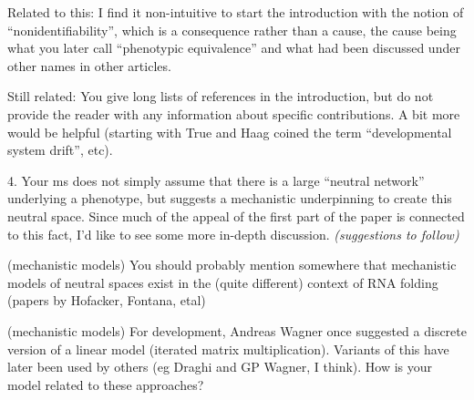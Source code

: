 \begin{point}{}
    Related to this: I find it non-intuitive to start the introduction with the
notion of ``nonidentifiability'', which is a consequence rather than a cause, the
cause being what you later call ``phenotypic equivalence'' and what had been
discussed under other names in other articles.
\end{point}


\begin{point}{}
    Still related: You give long lists of references in the introduction, but do
not provide the reader with any information about specific contributions. A bit
more would be helpful (starting with True and Haag coined the term
``developmental system drift'', etc).
\end{point}


\begin{point}{4.}
    Your ms does not simply assume that there is a large ``neutral network''
underlying a phenotype, but suggests a mechanistic underpinning to create this
neutral space. Since much of the appeal of the first part of the paper is
connected to this fact, I'd like to see some more in-depth discussion.
\textit{(suggestions to follow)}
\end{point}

\reply{
}

\begin{point}{(mechanistic models)}
    You should probably mention somewhere that mechanistic models of neutral
  spaces exist in the (quite different) context of RNA folding (papers by Hofacker, Fontana, etal)
\end{point}


\begin{point}{(mechanistic models)}
    For development, Andreas Wagner once suggested a discrete version of a linear
  model (iterated matrix multiplication). Variants of this have later been used
by others (eg Draghi and GP Wagner, I think). How is your model related to
these approaches?
\end{point}


